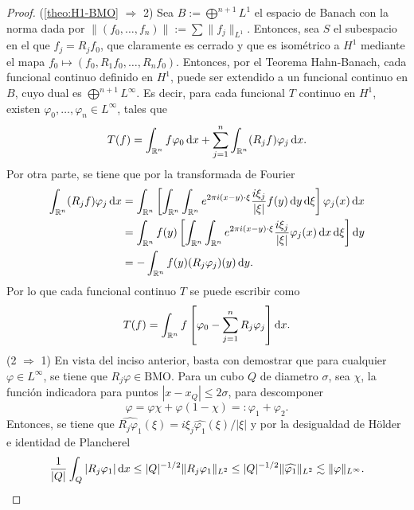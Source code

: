 \begin{proof}
	(\cref{theo:H1-BMO} $\Rightarrow$ 2) Sea $B:=\bigoplus^{n+1} L^1$ el espacio de Banach con la norma dada por $\|(f_0,\ldots,f_n)\| := \sum\|f_j\|_{L^1}$. Entonces, sea $S$ el subespacio en el que $f_j = R_jf_0$, que claramente es cerrado y que es isométrico a $H^1$ mediante el mapa $f_0\mapsto(f_0, R_1f_0, \ldots, R_nf_0 )$. Entonces, por el Teorema Hahn-Banach, cada funcional continuo definido en $H^1$, puede ser extendido a un funcional continuo en $B$, cuyo dual es $\bigoplus^{n+1}L^\infty$. Es decir, para cada funcional $T$ continuo en $H^1$, existen $\varphi_0,\ldots,\varphi_n\in L^\infty$, tales que
	\begin{equation*}
		T(f)  = \int_{\mathbb{R}^n} f\varphi_0\mathop{}\!\mathrm{d} x + \sum_{j=1}^n \int_{\mathbb{R}^n} (R_jf)\varphi_j\mathop{}\!\mathrm{d} x.
	\end{equation*}
	Por otra parte, se tiene que por la transformada de Fourier
	\begin{align*}
		\int_{\R^n}(R_jf)\varphi_j \diff x & = \int_{\R^n} \left[\int_{\R^n} \int_{\R^n} e^{2\pi i (x-y)\cdot\xi} \frac{i\xi_j}{|\xi|} f(y) \diff y \diff \xi
		\right]  \varphi_j(x) \diff x \\
		& = \int_{\R^n} f(y) \left[\int_{\R^n} \int_{\R^n} e^{2\pi i (x-y)\cdot\xi} \frac{i\xi_j}{|\xi|}  \varphi_j(x) \diff x  \diff \xi
		\right]  \diff y \\
		& = - \int_{\R^n} f(y) (R_j\varphi_j)(y) \diff y.
	\end{align*}
	Por lo que cada funcional continuo $T$ se puede escribir como 
	\begin{equation*}
		T(f) = \int_{\mathbb{R}^n} f \left[ \varphi_0 - \sum_{j=1}^n R_j\varphi_j
		\right] \mathop{}\!\mathrm{d} x.
	\end{equation*}
	(2 $\Rightarrow$ 1) En vista del inciso anterior, basta con demostrar que para cualquier $\varphi\in L^\infty$, se tiene que $R_j\varphi \in \mathrm{BMO}$. Para un cubo $Q$ de diametro $\sigma$, sea $\chi$, la función indicadora para puntos $|x-x_Q|\leq2\sigma$, para descomponer 
	\begin{equation*}
		\varphi = \varphi\chi + \varphi(1-\chi) =: \varphi_1 + \varphi_2. 
	\end{equation*}
	Entonces, se tiene que $\widehat{R_j\varphi_1}(\xi) = i\xi_j\widehat{\varphi_1}(\xi)/|\xi|$ y por la desigualdad de Hölder e identidad de Plancherel
	\begin{equation}\label{eq:Rj-L-infty}
		\frac{1}{|Q|}\int_Q |R_j\varphi_1|\diff x \leq |Q|^{-1/2} \|R_j\varphi_1\|_{L^2} \leq|Q|^{-1/2} \|\widehat{\varphi_1}\|_{L^2}  \lesssim \|\varphi\|_{L^\infty}.

\end{equation}
\end{proof}
